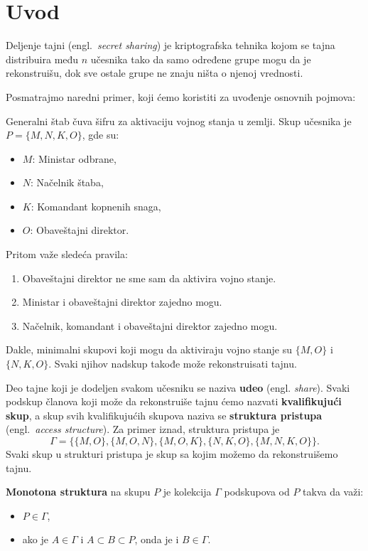 
\section{Uvod}
Deljenje tajni (engl.\ \textit{secret sharing}) je kriptografska tehnika kojom se tajna distribuira među $n$ učesnika tako da samo određene grupe mogu da je rekonstruišu, dok sve ostale grupe ne znaju ništa o njenoj vrednosti.

Posmatrajmo naredni primer, koji ćemo koristiti za uvođenje osnovnih pojmova:
\begin{example}\label{primer1}
Generalni štab čuva šifru za aktivaciju vojnog stanja u zemlji.
Skup učesnika je $P = \{M, N, K, O\}$, gde su:
\begin{itemize}
\item $M$: Ministar odbrane,
\item $N$: Načelnik štaba,
\item $K$: Komandant kopnenih snaga,
\item $O$: Obaveštajni direktor.
\end{itemize}

Pritom važe sledeća pravila:
\begin{enumerate}
\item Obaveštajni direktor ne sme sam da aktivira vojno stanje.
\item Ministar i obaveštajni direktor zajedno mogu.
\item Načelnik, komandant i obaveštajni direktor zajedno mogu.
\end{enumerate}

Dakle, minimalni skupovi koji mogu da aktiviraju vojno stanje su $\{M, O\}$ i $\{N, K, O\}$. Svaki njihov nadskup takođe može rekonstruisati tajnu.
\end{example}

Deo tajne koji je dodeljen svakom učesniku se naziva \textbf{udeo} (engl. \textit{share}).
Svaki podskup članova koji može da rekonstruiše tajnu ćemo nazvati \textbf{kvalifikujući skup}, a skup svih kvalifikujućih skupova naziva se \textbf{struktura pristupa} (engl.\ \textit{access structure}).
Za primer iznad, struktura pristupa je
\[\Gamma =\{\{M,O\}, \{M,O,N\}, \{M,O,K\}, \{N,K,O\}, \{M,N,K,O\}\}.\]
Svaki skup u strukturi pristupa je skup sa kojim možemo da rekonstruišemo tajnu.

\begin{definition}
\textbf{Monotona struktura} na skupu $P$ je kolekcija $\Gamma$ podskupova od $P$ takva da važi:
\begin{itemize}
\item $P \in \Gamma$,
\item ako je $A \in \Gamma$ i $A \subset B \subset P$, onda je i $B \in \Gamma$.
\end{itemize}
\end{definition}

